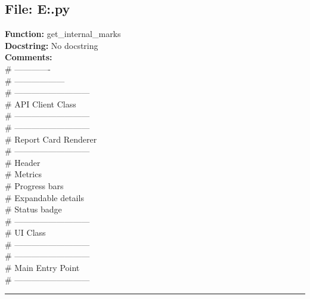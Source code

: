 {\subsection*{File: E:\project\capstone\frontend\view.py}
\textbf{Function:} get_internal_marks\\
\textbf{Docstring:} No docstring\\
\textbf{Comments:}\\
# -------------\\
# ------------------\\
# ---------------------------\\
# API Client Class\\
# ---------------------------\\
# ---------------------------\\
# Report Card Renderer\\
# ---------------------------\\
# Header\\
# Metrics\\
# Progress bars\\
# Expandable details\\
# Status badge\\
# ---------------------------\\
# UI Class\\
# ---------------------------\\
# ---------------------------\\
# Main Entry Point\\
# ---------------------------\\

\hrule

}
